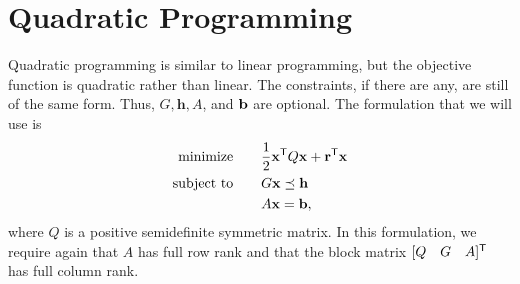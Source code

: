 \begin{comment}
>>> h = matrix([ 0., 0., 0., 0., 0., 0.,])
>>> o = matrix([4., 7., 6., 8., 8., 9])
>>> A = matrix([ [1., 0., 0., 1., 0.],
             [1., 0., 0., 0., 1.],
             [0., 1., 0., 1., 0.],
             [0., 1., 0., 0., 1.],
             [0., 0., 1., 1., 0.],
             [0., 0., 1., 0., 1.] ])
>>> b = matrix([7., 2., 4., 5., 8])
>>> sol = glpk.ilp(o,G,h,A,b)
>>> print sol[1]
\end{lstlisting}

\textbf{Problem 2}
Choose one of these methods and compare the optimal values for the integer linear program to the result you received above.

\textbf{Problem 3}
Create the dual problem for the linear program and solve.
Compare your answer to the dual value cvxopt returned.
\end{comment}

\section*{Quadratic Programming}

Quadratic programming is similar to linear programming, but the objective function is quadratic rather than linear.
The constraints, if there are any, are still of the same form.
Thus, $G, \mathbf{h}, A$, and $\mathbf{b}$ are optional.
The formulation that we will use is
\begin{align*}
\text{minimize}\qquad &\frac{1}{2}\mathbf{x}^{\mathsf T} Q\mathbf{x} + \mathbf{r}^{\mathsf T} \mathbf{x} \\
\text{subject to}\qquad &G\mathbf{x} \preceq \mathbf{h}\\
 &A\mathbf{x} = \mathbf{b},
\end{align*}
where $Q$ is a positive semidefinite symmetric matrix.
In this formulation, we require again that $A$ has full row rank and that the block matrix
$[Q \quad G \quad A]^{\mathsf T} $ has full column rank.

